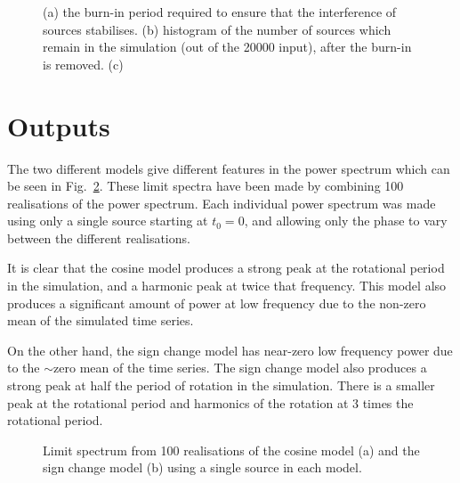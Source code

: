\begin{figure}[!ht]
	\caption{(a) the burn-in period required to ensure that the interference of sources stabilises. (b) histogram of the number of sources which remain in the simulation (out of the 20000 input), after the burn-in is removed. (c) }
	\label{fig:artificial_sim_config}
\end{figure}


\section{Outputs}

The two different models give different features in the power spectrum which can be seen in Fig.~\ref{fig:artificial_LS}. These limit spectra have been made by combining 100 realisations of the power spectrum. Each individual power spectrum was made using only a single source starting at $t_0 = 0$, and allowing only the phase to vary between the different realisations.

It is clear that the cosine model produces a strong peak at the rotational period in the simulation, and a harmonic peak at twice that frequency. This model also produces a significant amount of power at low frequency due to the non-zero mean of the simulated time series. 

On the other hand, the sign change model has near-zero low frequency power due to the $\sim$zero mean of the time series. The sign change model also produces a strong peak at half the period of rotation in the simulation. There is a smaller peak at the rotational period and harmonics of the rotation at 3 times the rotational period.

\begin{figure}[ht!]
	\centering
	\qquad
	\caption{Limit spectrum from 100 realisations of the cosine model (a) and the sign change model (b) using a single source in each model.}  \label{fig:artificial_LS}
\end{figure}


